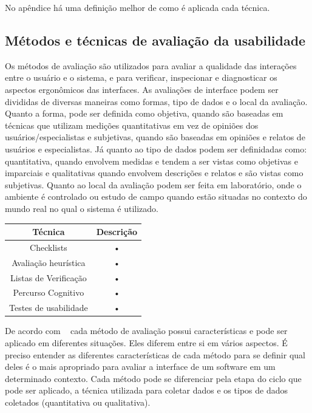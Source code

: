 No apêndice há uma definição melhor de como é aplicada cada técnica.


\subsection{Métodos e técnicas de avaliação da usabilidade}

Os métodos de avaliação são utilizados para avaliar a qualidade das interações entre o usuário e o sistema, e para verificar, inspecionar e diagnosticar os aspectos ergonômicos das interfaces. 
%
As avaliações de interface podem ser divididas de diversas maneiras como formas, tipo de dados e o local da avaliação. Quanto a forma, pode ser definida como objetiva, quando são baseadas em técnicas que utilizam medições quantitativas em vez de opiniões dos usuários/especialistas e subjetivas, quando são baseadas em opiniões e relatos de usuários e especialistas. Já quanto ao tipo de dados podem ser definidadas como: quantitativa, quando envolvem medidas e tendem a ser vistas como objetivas e imparciais e qualitativas quando envolvem descrições e relatos e são vistas como subjetivas. Quanto ao local da avaliação podem ser feita em laboratório, onde o ambiente é controlado ou estudo de campo quando estão situadas no contexto do mundo real no qual o sistema é utilizado.



\begin{tabular}{|c|c|}
\hline 
Técnica & Descrição \\ 
\hline 
Checklists & • \\ 
\hline 
Avaliação heurística & • \\ 
\hline 
Listas de Verificação & • \\ 
\hline 
Percurso Cognitivo & • \\ 
\hline 
Testes de usabilidade & • \\ 
\hline 
\end{tabular} 



De acordo com ~ cada método de avaliação possui características e pode ser aplicado em diferentes situações.
%
Eles diferem entre si em vários aspectos. É preciso entender as diferentes características de cada método para se definir qual deles é o mais apropriado para avaliar a interface de um software em um determinado contexto.
%
Cada método pode se diferenciar pela etapa do ciclo que pode ser aplicado, a técnica utilizada para coletar dados e os tipos de dados coletados (quantitativa ou qualitativa). 

